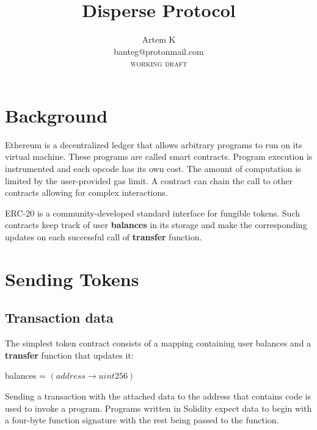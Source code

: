 \documentclass[12pt]{article}
\begin{document}
\title{Disperse Protocol}
\author{Artem K\\ \small{banteg@protonmail.com} \\
\small{\textsc{working draft}}}  %

\maketitle
{}

\section{Background}
Ethereum is a decentralized ledger that allows arbitrary programs to run on its virtual machine.
These programs are called smart contracts.
Program execution is instrumented and each opcode has its own cost.
The amount of computation is limited by the user-provided gas limit.
A contract can chain the call to other contracts allowing for complex interactions.\cite{ethereum}

ERC-20 is a community-developed standard interface for fungible tokens\cite{eip20}.
Such contracts keep track of user \textbf{balances} in its storage and make the corresponding updates on each successful call of \textbf{transfer} function.

\section{Sending Tokens}
\subsection{Transaction data}
The simplest token contract consists of a mapping containing user balances and a \textbf{transfer} function that updates it:
%
\begin{center}
	balances = $(address \rightarrow uint256)$
\end{center}
%
Sending a transaction with the attached data to the address that contains code is used to invoke a program.
Programs written in Solidity expect data to begin with a four-byte function signature with the rest being passed to the function.
\end{document}
